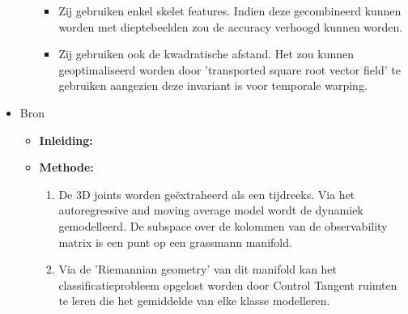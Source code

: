 \begin{itemize}
\begin{itemize}
\begin{itemize}
			\item Zij gebruiken enkel skelet features. Indien deze gecombineerd kunnen worden met dieptebeelden zou de accuracy verhoogd kunnen worden.
			\item Zij gebruiken ook de kwadratische afstand. Het zou kunnen geoptimaliseerd worden door 'transported square root vector field' \cite{Su2014} te gebruiken aangezien deze invariant is voor temporale warping.
		\end{itemize}
	\end{itemize}
	\item Bron \cite{Slama2015}
	\begin{itemize}
		\item \textbf{Inleiding:} 
		\item \textbf{Methode:} 
		\begin{enumerate}
			\item De 3D joints worden geëxtraheerd als een tijdreeks. Via het autoregressive and moving average model wordt de dynamiek gemodelleerd. De subspace over de kolommen van de observability matrix is een punt op een grassmann manifold.
			\item Via de 'Riemannian geometry' van dit manifold kan het classificatieprobleem opgelost worden door Control Tangent ruimten te leren die het gemiddelde van elke klasse modelleren.
			

\end{enumerate}
\end{itemize}
\end{itemize}
